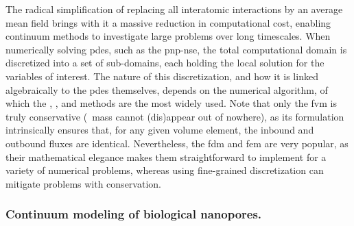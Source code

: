 The radical simplification of replacing all interatomic interactions by an average mean field brings with it a
massive reduction in computational cost, enabling continuum methods to investigate large problems over long
timescales. When numerically solving \glspl{pde}, such as the \gls{pnp-nse}, the total computational domain is
discretized into a set of sub-domains, each holding the local solution for the variables of interest. The
nature of this discretization, and how it is linked algebraically to the \glspl{pde} themselves, depends on
the numerical algorithm, of which the , , and  methods are the most widely used. Note that only the
\gls{fvm} is truly conservative (\ie~mass cannot (dis)appear out of nowhere), as its formulation intrinsically
ensures that, for any given volume element, the inbound and outbound fluxes are identical. Nevertheless, the
\gls{fdm} and \gls{fem} are very popular, as their mathematical elegance makes them straightforward to
implement for a variety of numerical problems, whereas using fine-grained discretization can mitigate problems
with conservation.


\subsubsection{Continuum modeling of biological nanopores.}
%

